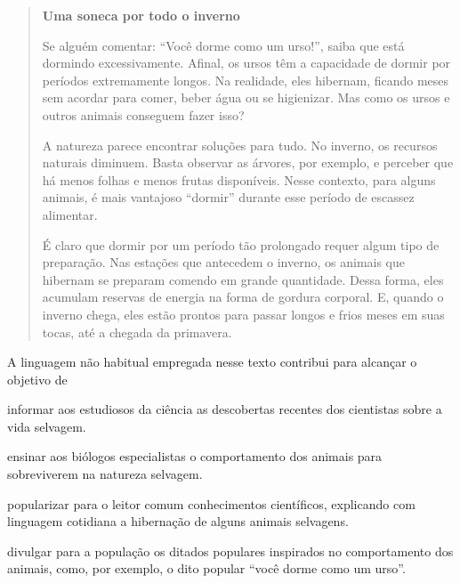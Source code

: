 \begin{quote}
\centering\textbf{Uma soneca por todo o inverno}

Se alguém comentar: ``Você dorme como um urso!'', saiba que está
dormindo excessivamente. Afinal, os ursos têm a capacidade de dormir por
períodos extremamente longos. Na realidade, eles hibernam, ficando meses
sem acordar para comer, beber água ou se higienizar. Mas como os ursos e
outros animais conseguem fazer isso?

A natureza parece encontrar soluções para tudo. No inverno, os recursos
naturais diminuem. Basta observar as árvores, por exemplo, e perceber
que há menos folhas e menos frutas disponíveis. Nesse contexto, para
alguns animais, é mais vantajoso ``dormir'' durante esse período de
escassez alimentar.

É claro que dormir por um período tão prolongado requer algum tipo de
preparação. Nas estações que antecedem o inverno, os animais que
hibernam se preparam comendo em grande quantidade. Dessa forma, eles
acumulam reservas de energia na forma de gordura corporal. E, quando o
inverno chega, eles estão prontos para passar longos e frios meses em
suas tocas, até a chegada da primavera.

\end{quote}

A linguagem não habitual empregada nesse texto contribui para alcançar o
objetivo de

\begin{escolha}

\item informar aos estudiosos da ciência as descobertas recentes dos cientistas sobre a vida selvagem.

\item ensinar aos biólogos especialistas o comportamento dos animais para sobreviverem na natureza selvagem.

\item popularizar para o leitor comum conhecimentos científicos, explicando
com linguagem cotidiana a hibernação de alguns animais selvagens.

\item divulgar para a população os ditados populares inspirados no
comportamento dos animais, como, por exemplo, o dito popular ``você dorme como um urso''.
\end{escolha}

